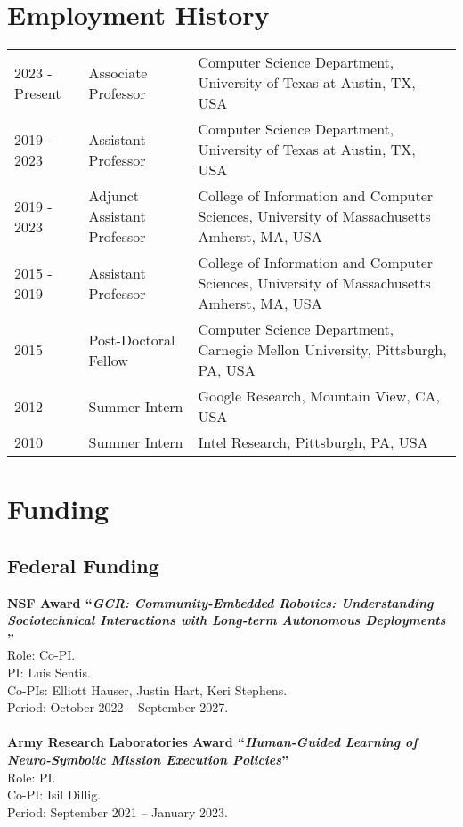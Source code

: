 \documentclass[Times]{article}
\newcommand{\funding}[1]{#1\\}
\renewcommand{\funding}[1]{\\}
\begin{document}

\section*{Employment History}
\begin{tabular}{ p{2cm} l p{8cm}}
  2023 - Present & Associate Professor & Computer Science Department,
  University of Texas at Austin, TX, USA \\
  2019 - 2023 & Assistant Professor & Computer Science Department,
  University of Texas at Austin, TX, USA \\
  2019 - 2023 & Adjunct Assistant Professor &  College of Information and Computer Sciences, University of Massachusetts Amherst, MA, USA\\
  2015 - 2019  & Assistant Professor &  College of Information and Computer Sciences, University of Massachusetts Amherst, MA, USA\\
  2015 & Post-Doctoral Fellow &  Computer Science Department, Carnegie Mellon University, Pittsburgh, PA, USA\\
  2012 & Summer Intern &  Google Research, Mountain View, CA, USA\\
  2010 & Summer Intern &  Intel Research, Pittsburgh, PA, USA\\
\end{tabular}


\section*{Funding}

\subsection*{Federal Funding}

\textbf{NSF Award ``\emph{GCR: Community-Embedded Robotics: Understanding Sociotechnical Interactions with Long-term Autonomous Deployments
}''}\\
Role: Co-PI.\\
PI: Luis Sentis.\\
Co-PIs: Elliott Hauser, Justin Hart, Keri Stephens.\\
Period: October 2022 -- September 2027.\\
\funding{Amount: \$3,600,000}

\textbf{Army Research Laboratories Award ``\emph{Human-Guided Learning of Neuro-Symbolic Mission Execution Policies}''}\\
Role: PI.\\
Co-PI: Isil Dillig.\\
Period: September 2021 -- January 2023.\\
\funding{Amount: \$372,798}
\end{document}
